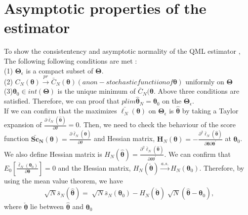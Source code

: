\documentclass[12pt,a4paper,hyperref]{article}
\begin{document}
\section{Asymptotic properties of the estimator}

To show the consistentency and asymptotic normality of the  QML estimator ,
The following following conditions are met :  \\
(1) $\boldsymbol{\Theta}_{\epsilon}$ is a compact subset of $\boldsymbol{\Theta}$. \\
(2)   $C_{N}(\boldsymbol{\theta})\overset{pr}{\to} \bar{C}_{N}(\boldsymbol{\theta})(a non-stochastic functiion of \boldsymbol{\theta} )$ uniformly on $\boldsymbol{\Theta}$ \\
(3)$\boldsymbol{\theta}_{0}\in int(\boldsymbol{\Theta})$ is the unique minimum of $\bar{C}_{N}(\boldsymbol{\theta}$. Above three conditions are satisfied. Therefore, we can proof that $plim\boldsymbol{\hat{\theta}}_{N}=\boldsymbol{\theta}_{0}$ on the $\boldsymbol{\Theta}_{\epsilon}$. \\


If we can confirm that the maximizes $\bar{\ell_{N}}(\boldsymbol{\theta})$ on $\boldsymbol{\Theta}_{\epsilon}$ is $\boldsymbol{\hat{\theta}}$ by taking a Taylor expansion of $\frac{\partial\bar{\ell}_{N}\left(\boldsymbol{ \hat{\theta}} \right)}{\partial \theta}=0$. Then, we need to check the behaviour of the score function $\boldsymbol{\bar{Sc}_{N}(\theta)}=\frac{\partial\bar{\ell}_{N}\left(\boldsymbol{ \hat{\theta}} \right)}{\partial \theta}$ and Hessian matrix, $\boldsymbol{H}_{N}(\boldsymbol{\theta})=-\frac{\partial^{2}\bar{\ell}_{N}\left(\boldsymbol{ \hat{\theta}} \right)}{\partial \boldsymbol{\theta}\partial \boldsymbol{\theta}^{'}}$ at $\boldsymbol{\theta}_{0}$. We also define Hessian matrix is  $H_{N}\left( \boldsymbol{\hat{\theta}}\right)=\frac{\partial^{2}\bar{\ell}_{N}\left(\boldsymbol{ \hat{\theta}} \right)}{\partial \theta \theta^{'}}$.
We can confirm that $E_{0}\left[ \frac{\bar{\ell}_{N}(\boldsymbol{\theta}_{0})}{\partial \boldsymbol{\theta}}  \right]=0$ and the Hessian matrix, $H_{N}\left( \boldsymbol{\check{\theta}}\right) \overset{a.s.}{\to} H_{N}\left( \boldsymbol{\theta}_{0}\right)$.
 Therefore, by using the mean value theorem, we have
\begin{align}
\sqrt[]{N}\bar{s}_{N}\left( \hat{\boldsymbol{\theta}} \right)=\sqrt[]{N}\bar{s}_{N}\left( \boldsymbol{\theta}_{0}\right)-H_{N} ( \boldsymbol{\check{\theta}} )\sqrt[]{N} ( \boldsymbol{\hat{\theta}}-\boldsymbol{\theta}_{0} ),
\end{align}
where $\boldsymbol{\check{\theta}}$ lie between $\boldsymbol{\hat{\theta}}$ and $\boldsymbol{\theta}_{0}$
\end{document}
